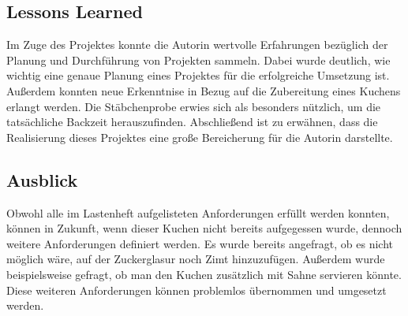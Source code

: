 \subsection{Lessons Learned}
Im Zuge des Projektes konnte die Autorin wertvolle Erfahrungen bezüglich der Planung und Durchführung von Projekten sammeln.
Dabei wurde deutlich, wie wichtig eine genaue Planung eines Projektes für die erfolgreiche Umsetzung ist. Außerdem konnten neue Erkenntnise in Bezug auf die Zubereitung eines Kuchens erlangt werden.
Die Stäbchenprobe erwies sich als besonders nützlich, um die tatsächliche Backzeit herauszufinden. Abschließend ist zu erwähnen, dass die Realisierung dieses Projektes eine große Bereicherung für die Autorin darstellte.
\subsection{Ausblick}
Obwohl alle im Lastenheft aufgelisteten Anforderungen erfüllt werden konnten, können in Zukunft, wenn dieser Kuchen nicht bereits aufgegessen wurde, dennoch weitere Anforderungen definiert werden. Es wurde bereits angefragt, ob es nicht möglich wäre, auf der Zuckerglasur noch Zimt hinzuzufügen. 
Außerdem wurde beispielsweise gefragt, ob man den Kuchen zusätzlich mit Sahne servieren könnte. Diese weiteren Anforderungen können problemlos übernommen und umgesetzt werden.

